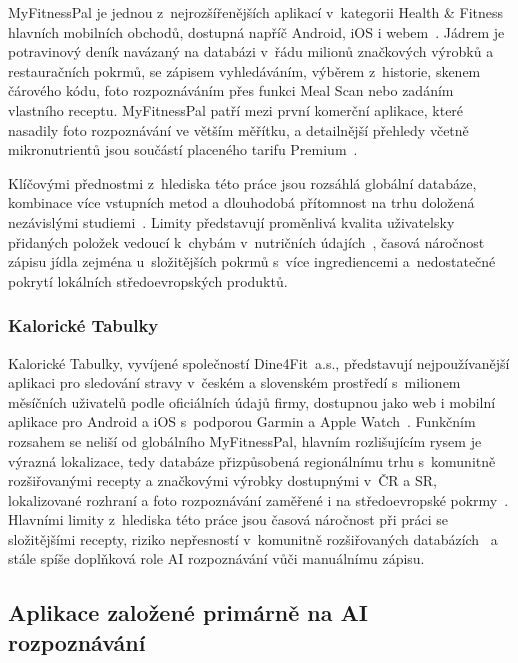 MyFitnessPal je jednou z~nejrozšířenějších aplikací v~kategorii Health \& Fitness hlavních mobilních obchodů, dostupná napříč Android, iOS i webem~\cite{myFitnessPal2025}.
Jádrem je potravinový deník navázaný na databázi v~řádu milionů značkových výrobků a restauračních pokrmů, se zápisem vyhledáváním, výběrem z~historie, skenem čárového kódu, foto rozpoznáváním přes funkci Meal Scan nebo zadáním vlastního receptu.
MyFitnessPal patří mezi první komerční aplikace, které nasadily foto rozpoznávání ve větším měřítku, a detailnější přehledy včetně mikronutrientů jsou součástí placeného tarifu Premium~\cite{myFitnessPal2025}.

Klíčovými přednostmi z~hlediska této práce jsou rozsáhlá globální databáze, kombinace více vstupních metod a dlouhodobá přítomnost na trhu doložená nezávislými studiemi~\cite{samad2022smartphoneApps}.
Limity představují proměnlivá kvalita uživatelsky přidaných položek vedoucí k~chybám v~nutričních údajích~\cite{li2024evaluating}, časová náročnost zápisu jídla zejména u~složitějších pokrmů s~více ingrediencemi a~nedostatečné pokrytí lokálních středoevropských produktů.

\subsubsection{Kalorické Tabulky}
\label{subsubsec:kalorickeTabulky}

Kalorické Tabulky, vyvíjené společností Dine4Fit~a.s., představují nejpoužívanější aplikaci pro sledování stravy v~českém a slovenském prostředí s~milionem měsíčních uživatelů podle oficiálních údajů firmy, dostupnou jako web i mobilní aplikace pro Android a iOS s~podporou Garmin a Apple Watch~\cite{dine4fit2025}.
Funkčním rozsahem se neliší od globálního MyFitnessPal, hlavním rozlišujícím rysem je výrazná lokalizace, tedy databáze přizpůsobená regionálnímu trhu s~komunitně rozšiřovanými recepty a značkovými výrobky dostupnými v~ČR a SR, lokalizované rozhraní a foto rozpoznávání zaměřené i na středoevropské pokrmy~\cite{dine4fit2025}.
Hlavními limity z~hlediska této práce jsou časová náročnost při práci se složitějšími recepty, riziko nepřesností v~komunitně rozšiřovaných databázích~\cite{li2024evaluating} a stále spíše doplňková role AI rozpoznávání vůči manuálnímu zápisu.

\subsection{Aplikace založené primárně na AI rozpoznávání}
\label{subsec:aiFirstAplikace}

